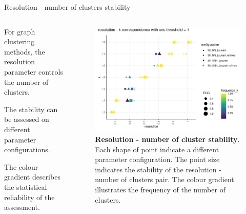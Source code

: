 \begin{frame}{Resolution - number of clusters stability}
    \begin{columns}
        \begin{column}{0.45\textwidth}
            \justifying

            For graph clustering methods, the resolution parameter controls the number of clusters.
            \bigskip


            The stability can be assessed on different parameter configurations.
            \bigskip

            The colour gradient describes the statistical reliability of the assessment.


        \end{column}

        \begin{column}{0.5\textwidth}
            \begin{figure}
                \centering
                \includegraphics[width=\textwidth]{images/ch3/3_1_kres_ecc.png}
                \caption{\justifying \textbf{Resolution - number of cluster stability}. Each shape of point indicate a different parameter configuration. The point size indicates the stability of the resolution - number of clusters pair. The colour gradient illustrates the frequency of the number of clusters.}
            \end{figure}
        \end{column}
    \end{columns}
\end{frame}